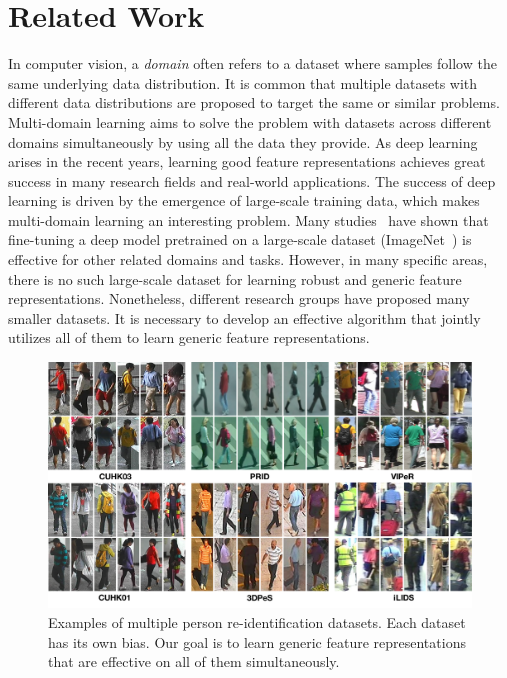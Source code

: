 \section{Related Work} %
\label{sec:md-related-work}
In computer vision, a \emph{domain} often refers to a dataset where samples follow the same underlying data distribution. It is common that multiple datasets with different data distributions are proposed to target the same or similar problems. Multi-domain learning aims to solve the problem with datasets across different domains simultaneously by using all the data they provide. As deep learning arises in the recent years, learning good feature representations achieves great success in many research fields and real-world applications. The success of deep learning is driven by the emergence of large-scale training data, which makes multi-domain learning an interesting problem. Many studies~\cite{donahue2014decaf,azizpour2015generic,oquab2014learning} have shown that fine-tuning a deep model pretrained on a large-scale dataset (\eg ImageNet~\cite{deng2009imagenet}) is effective for other related domains and tasks. However, in many specific areas, there is no such large-scale dataset for learning robust and generic feature representations. Nonetheless, different research groups have proposed many smaller datasets. It is necessary to develop an effective algorithm that jointly utilizes all of them to learn generic feature representations.

\begin{figure}[t]
\begin{center}
\includegraphics[width=1.0\linewidth]{figures/multi_domain/reid_datasets.pdf}
\end{center}
\caption{Examples of multiple person re-identification datasets. Each dataset has its own bias. Our goal is to learn generic feature representations that are effective on all of them simultaneously.}
\label{fig:md-reid-datasets}
\end{figure}

